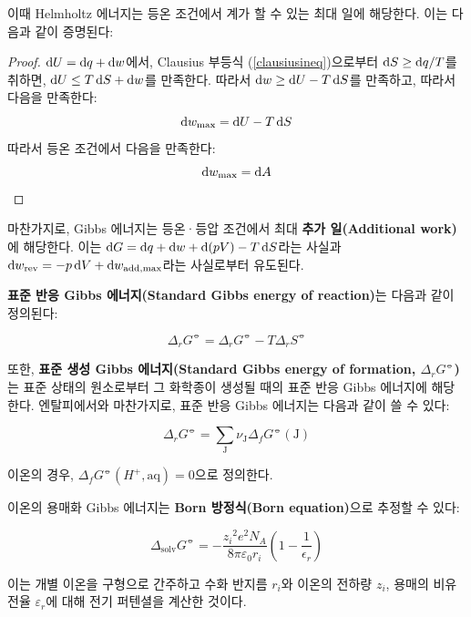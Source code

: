         이때 Helmholtz 에너지는 등온 조건에서 계가 할 수 있는 최대 일에 해당한다. 이는 다음과 같이 증명된다:
        \begin{proof}
        \par $\operatorname{d\!} U = \operatorname{d\!} q + \operatorname{d\!} w$에서, Clausius 부등식 (\ref{clausiusineq})으로부터 $\operatorname{d\!} S \geq \operatorname{d\!} q/T$를 취하면,
        $\operatorname{d\!} U \leq T\operatorname{d\!} S + \operatorname{d\!} w$를 만족한다. 따라서 $\operatorname{d\!} w \geq \operatorname{d\!} U -T\operatorname{d\!} S$를 만족하고, 따라서 다음을 만족한다:
        \begin{equation*}
            \operatorname{d\!} w_{\mathrm{max}} = \operatorname{d\!} U - T \operatorname{d\!} S
        \end{equation*}
        따라서 등온 조건에서 다음을 만족한다:
        \begin{equation*}
            \operatorname{d\!} w_\mathrm{max} = \operatorname{d\!} A
        \end{equation*}
        \end{proof}
        마찬가지로, Gibbs 에너지는 등온·등압 조건에서 최대 \textbf{추가 일(Additional work)}에 해당한다. 이는 $\operatorname{d\!} G = \operatorname{d\!} q + \operatorname{d\!} w + \operatorname{d\!} \left(pV\right) - T\operatorname{d\!} S$라는 
        사실과 $\operatorname{d\!} w_\mathrm{rev} = -p\operatorname{d\!} V + \operatorname{d\!} w_\mathrm{add,max}$라는 사실로부터 유도된다.
        \par \textbf{표준 반응 Gibbs 에너지(Standard Gibbs energy of reaction)}는 다음과 같이 정의된다:
        \begin{defn}
        \begin{equation*}
            \Delta_r G^{\circlehbar} = \Delta_r G^\circlehbar - T\Delta_r S^\circlehbar
        \end{equation*}
        \end{defn}
        또한, \textbf{표준 생성 Gibbs 에너지(Standard Gibbs energy of formation, $\Delta_r G^\circlehbar$)}는 표준 상태의 원소로부터 그 화학종이 생성될 때의 표준 반응 Gibbs 에너지에 해당한다. 엔탈피에서와 
        마찬가지로, 표준 반응 Gibbs 에너지는 다음과 같이 쓸 수 있다:
        \begin{defn}
        \begin{equation*}
            \Delta_r G^\circlehbar = \sum_{\mathrm{J}}\nu_\mathrm{J}\Delta_f G^\circlehbar\left(\mathrm{J}\right)
        \end{equation*}
        \end{defn}
        이온의 경우, $\displaystyle\Delta_f G^\circlehbar \left(H^{+},\mathrm{aq}\right) = 0$으로 정의한다.
        \par 이온의 용매화 Gibbs 에너지는 \textbf{Born 방정식(Born equation)}으로 추정할 수 있다:
        \begin{law}
        \begin{equation*}
            \Delta_\mathrm{solv}G^\circlehbar = -\frac{{z_i}^2 e^2 N_A}{8 \pi \varepsilon_0 r_i}\left( 1-\frac{1}{\epsilon_r}\right)
        \end{equation*}
        \end{law}
        이는 개별 이온을 구형으로 간주하고 수화 반지름 $r_i$와 이온의 전하량 $z_i$, 용매의 비유전율 $\varepsilon_r$에 대해 전기 퍼텐셜을 계산한 것이다.

